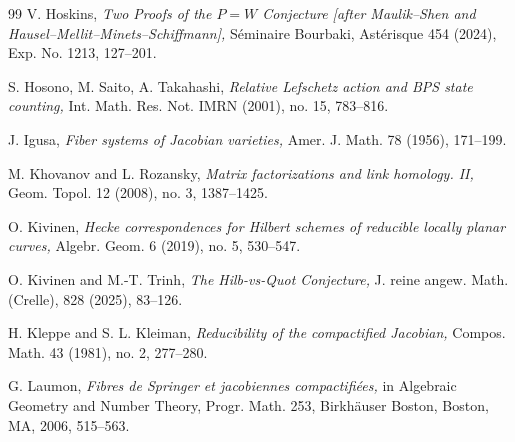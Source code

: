 \documentclass{pspum-l}
\theoremstyle{plain}
\theoremstyle{definition}
\theoremstyle{remark}
\newcommand{\BP}{{\mathbb{P}}}
\begin{document}
\begin{thebibliography}{99}
 V. Hoskins, {\em Two Proofs of the $P = W$ Conjecture [after Maulik--Shen and Hausel--Mellit--Minets--Schiffmann],} S\'eminaire Bourbaki, Ast\'erisque 454 (2024), Exp. No. 1213, 127--201.

 S. Hosono, M. Saito, A. Takahashi, {\em Relative Lefschetz action and BPS state counting,} Int. Math. Res. Not. IMRN (2001), no. 15, 783--816.




 J. Igusa, {\em  Fiber systems of Jacobian varieties,} Amer. J. Math. 78 (1956), 171--199.




 M. Khovanov and L. Rozansky, {\em Matrix factorizations and link homology. II,} Geom. Topol. 12 (2008), no. 3, 1387--1425.

 O. Kivinen, {\em Hecke correspondences for Hilbert schemes of reducible locally planar curves,} Algebr. Geom. 6 (2019), no. 5, 530--547.


 O. Kivinen and M.-T. Trinh, {\em The Hilb-vs-Quot Conjecture,} J. reine angew. Math. (Crelle), 828 (2025), 83--126.


 H. Kleppe and S. L. Kleiman,
{\em Reducibility of the compactified Jacobian,} Compos. Math. 43 (1981), no. 2, 277--280.












 G. Laumon, {\em Fibres de Springer et jacobiennes compactifi\'ees,} in Algebraic Geometry and Number Theory, Progr. Math. 253, Birkh\"auser Boston, Boston, MA, 2006, 515--563.






\end{thebibliography}
\end{document}
